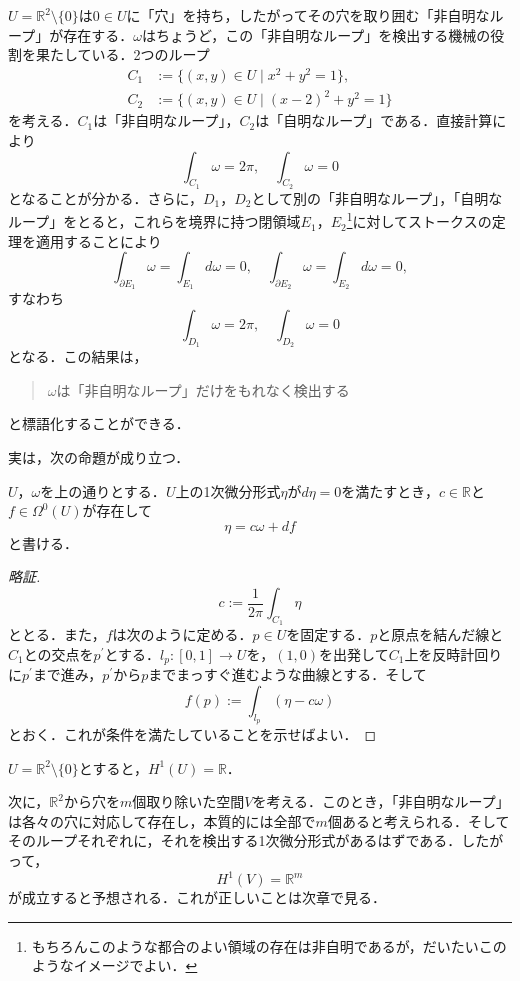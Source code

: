 \documentclass[uplatex]{jsarticle}
\begin{document}
$U=\mathbb{R}^2\setminus \{0\}$は$0\in U$に「穴」を持ち，したがってその穴を取り囲む「非自明なループ」が存在する．$\omega$はちょうど，この「非自明なループ」を検出する機械の役割を果たしている．2つのループ
\begin{align*}
  C_1&:=\{(x,y)\in U\mid x^2+y^2=1\}, \\
  C_2&:=\{(x,y)\in U\mid (x-2)^2+y^2=1\} 
\end{align*}
を考える．$C_1$は「非自明なループ」，$C_2$は「自明なループ」である．直接計算により
\[ \int_{C_1} \omega=2\pi, \quad \int_{C_2} \omega=0 \]
となることが分かる．さらに，$D_1$，$D_2$として別の「非自明なループ」，「自明なループ」をとると，これらを境界に持つ閉領域$E_1$，$E_2$\footnote{もちろんこのような都合のよい領域の存在は非自明であるが，だいたいこのようなイメージでよい．}に対してストークスの定理を適用することにより
\[ \int_{\partial E_1} \omega = \int_{E_1} d\omega=0,\quad  \int_{\partial E_2} \omega = \int_{E_2} d\omega=0, \]
すなわち
\[ \int_{D_1} \omega = 2\pi,\quad  \int_{D_2} \omega = 0 \]
となる．この結果は，
\begin{quotation}
$\omega$は「非自明なループ」だけをもれなく検出する
\end{quotation}
と標語化することができる．

実は，次の命題が成り立つ．
\begin{proposition}
$U$，$\omega$を上の通りとする．$U$上の1次微分形式$\eta$が$d\eta=0$を満たすとき，$c\in \mathbb{R}$と$f\in \Omega^0(U)$が存在して
\[ \eta=c\omega+df \]
と書ける．
\end{proposition}
\begin{proof}[略証]
\[ c:=\frac{1}{2\pi}\int_{C_1} \eta \]
ととる．また，$f$は次のように定める．$p\in U$を固定する．$p$と原点を結んだ線と$C_1$との交点を$p^{\prime}$とする．$l_p\colon [0,1]\to U$を，$(1,0)$を出発して$C_1$上を反時計回りに$p^{\prime}$まで進み，$p^{\prime}$から$p$までまっすぐ進むような曲線とする．そして
\[ f(p):=\int_{l_p} (\eta-c\omega) \]
とおく．これが条件を満たしていることを示せばよい．
\end{proof}
\begin{corollary}\label{cor1}
$U=\mathbb{R}^2\setminus \{0\}$とすると，$H^1(U)=\mathbb{R}$．
\end{corollary}
次に，$\mathbb{R}^2$から穴を$m$個取り除いた空間$V$を考える．このとき，「非自明なループ」は各々の穴に対応して存在し，本質的には全部で$m$個あると考えられる．そしてそのループそれぞれに，それを検出する1次微分形式があるはずである．したがって，
\[ H^1(V)=\mathbb{R}^m \]
が成立すると予想される．これが正しいことは次章で見る．
\end{document}
